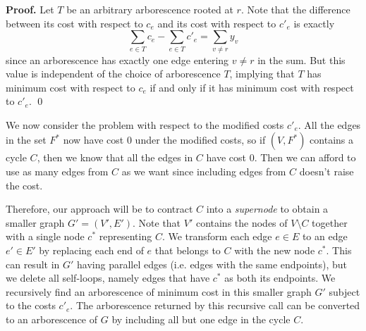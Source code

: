 \documentclass{article}
\begin{document}
{\color{blue}
{\bf Proof.} Let $T$ be an arbitrary arborescence rooted at $r$. Note that 
the difference between its cost with respect to $c_e$ and 
its cost with respect to $c'_e$ is exactly 
\[ \sum_{e\in T} c_e - \sum_{e\in T} c'_e = \sum_{v\neq r} y_v \] 
since an arborescence has exactly one edge entering $v \neq r$ in the sum.
But this value is independent of the choice of arborescence $T$, implying that 
$T$ has minimum cost with respect to $c_e$ if and only if it has minimum 
cost with respect to $c'_e$. \qed 
}

We now consider the problem with respect to the modified costs $c'_e$. 
All the edges in the set $F^*$ now have cost $0$ under the modified costs, 
so if $(V, F^*)$ contains a cycle $C$, then we know that all the edges in 
$C$ have cost $0$. Then we can afford to use as many edges from $C$ 
as we want since including edges from $C$ doesn't raise the cost. 

Therefore, our approach will be to contract $C$ into a \emph{supernode} to 
obtain a smaller graph $G' = (V', E')$. Note that $V'$ contains the 
nodes of $V \setminus C$ together with a single node $c^*$ representing $C$. 
We transform each edge $e \in E$ to an edge $e' \in E'$ by replacing 
each end of $e$ that belongs to $C$ with the new node $c^*$. This can 
result in $G'$ having parallel edges (i.e. edges with the same endpoints), 
but we delete all self-loops, namely edges that have $c^*$ as both its endpoints.
We recursively find an arborescence of minimum cost in this smaller graph 
$G'$ subject to the costs $c'_e$. The arborescence returned by this recursive 
call can be converted to an arborescence of $G$ by including all but one edge 
in the cycle $C$. 
\end{document}
